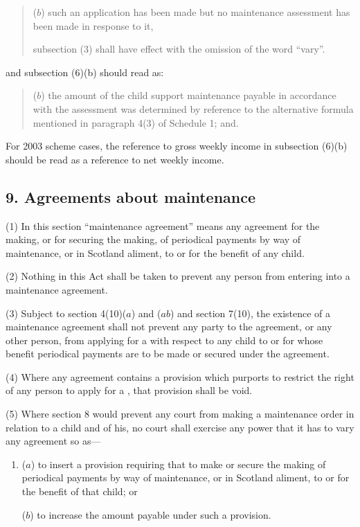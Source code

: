 \documentclass[a4paper]{article}
\begin{document}
{\begin{quotation}
\begin{enumerate}
($b$)
such an application has been made but no maintenance assessment has been
made in response to it,
\end{enumerate}
subsection (3) shall have effect with the omission of the word “vary”.
\end{quotation}
and subsection (6)(b) should read as:
\begin{quotation}
($b$)
the amount of the child support maintenance payable in accordance with
the assessment was determined by reference to the alternative formula
mentioned in paragraph 4(3) of Schedule 1; and.
\end{quotation}

For 2003 scheme cases, the reference to gross weekly income in subsection (6)(b) should be read as a reference to net weekly income.
}

\subsection{9. Agreements about maintenance}

(1) In
this section “maintenance agreement” means any agreement for the
making, or for securing the making, of periodical payments by way of maintenance, or in Scotland aliment, to or for the benefit of any child.

(2) Nothing in this Act shall be taken to prevent any person from entering into
a maintenance agreement.

(3) Subject to section 4(10)($a$) and ($ab$) and section 7(10), the existence of a
maintenance agreement shall not prevent any party to the agreement, or any other
person, from applying for a 
with
respect to any child to or for whose benefit periodical payments are to be made or
secured under the agreement.

(4) Where any agreement contains a provision which purports to restrict the
right of any person to apply for a ,
that provision shall be void.

(5) Where section 8 would prevent any court from making a maintenance order
in relation to a child and 
of his, no court
shall exercise any power that it has to vary any agreement so as---
\begin{enumerate}\item[]
($a$) to insert a provision requiring that 
to
make or secure the making of periodical payments by way of maintenance,
or in Scotland aliment, to or for the benefit of that child; or

($b$)
to increase the amount payable under such a provision.
\end{enumerate}
\end{document}
